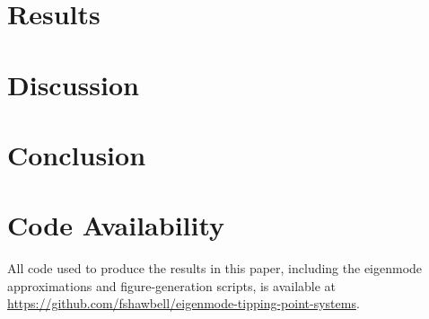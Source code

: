 \documentclass[11pt]{amsart}
\begin{document}
  \section{Results}
  \section{Discussion}
  \section{Conclusion}
  \section*{Code Availability}
    All code used to produce the results in this paper, including the eigenmode approximations and figure-generation scripts, is available at \url{https://github.com/fshawbell/eigenmode-tipping-point-systems}.
  \printbibliography
\end{document}
